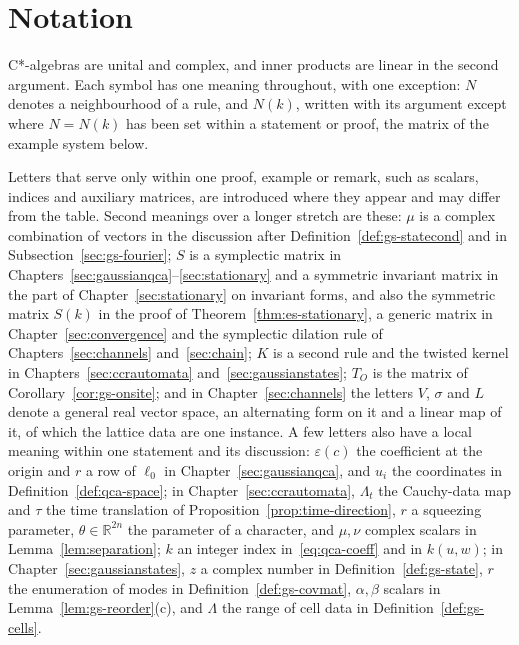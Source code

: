 \documentclass[11pt]{article}
\numberwithin{equation}{section}
\theoremstyle{definition}
\theoremstyle{remark}
\theoremstyle{plain}
\newcommand{\R}{\mathbb R}
\newcommand{\reve}[1]{#1}
\newcommand{\revs}[1]{#1}
\newcommand{\revt}[1]{#1}
\begin{document}
\section*{Notation}
\noindent\revs{C*-algebras are unital and complex, and inner products are linear in the second
argument.} Each symbol has one meaning throughout, with one exception: $N$ denotes a neighbourhood of a rule, and $N(k)$, \revt{written with its argument except where $N=N(k)$ has been set within a statement or proof,} the matrix of the example system below.\par\medskip\noindent \reve{Letters that serve only within one proof,
example or remark, such as scalars, indices and auxiliary matrices, are introduced where they appear
and may differ from the table. Second meanings over a longer stretch are these: $\mu$ is a complex
combination of vectors in the discussion after Definition~\ref{def:gs-statecond} and in
Subsection~\ref{sec:gs-fourier}; $S$ is a symplectic matrix in
Chapters~\ref{sec:gaussianqca}--\ref{sec:stationary} \reve{and a symmetric invariant matrix in the part of Chapter~\ref{sec:stationary} on invariant forms}\revt{, and also the symmetric matrix $S(k)$ in the proof of Theorem~\ref{thm:es-stationary}, a generic matrix in Chapter~\ref{sec:convergence} and the symplectic dilation rule of Chapters~\ref{sec:channels} and~\ref{sec:chain}}; $K$ is a second rule and the twisted kernel in
Chapters~\ref{sec:ccrautomata} and~\ref{sec:gaussianstates}; $T_O$ is the matrix of
Corollary~\ref{cor:gs-onsite}; and in Chapter~\ref{sec:channels} the letters $V$, $\sigma$ and $L$
denote a general real vector space, an alternating form on it and a linear map of it, of which the
lattice data are one instance.} \revt{A few letters also have a local meaning within one
statement and its discussion: $\varepsilon(c)$ the coefficient at the origin and $r$ a row of $\ell_0$
in Chapter~\ref{sec:gaussianqca}, and $u_i$ the coordinates in Definition~\ref{def:qca-space}; in
Chapter~\ref{sec:ccrautomata}, $\Lambda_t$ the Cauchy-data map and $\tau$ the time translation of
Proposition~\ref{prop:time-direction}, $r$ a squeezing parameter, $\theta\in\R^{2n}$ the parameter of a
character, and $\mu,\nu$ complex scalars in Lemma~\ref{lem:separation}; $k$ an integer index
in~\eqref{eq:qca-coeff} and in $k(u,w)$; in Chapter~\ref{sec:gaussianstates}, $z$ a complex number in
Definition~\ref{def:gs-state}, $r$ the enumeration of modes in Definition~\ref{def:gs-covmat},
$\alpha,\beta$ scalars in Lemma~\ref{lem:gs-reorder}(c), and $\Lambda$ the range of cell data in
Definition~\ref{def:gs-cells}.}
\end{document}
